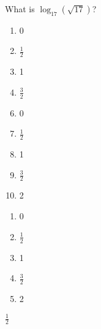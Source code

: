 






 What is $\log_{17}(\sqrt{17})$?


\ifsat
	\begin{enumerate}[label=\Alph*)]
		\item  0
		\item  $\frac{1}{2}$%
		\item  1
		\item $\frac{3}{2}$
	\end{enumerate}
\else
\fi

\ifacteven
	\begin{enumerate}[label=\textbf{\Alph*.},itemsep=\fill,align=left]
		\setcounter{enumii}{5}
		\item  0
		\item  $\frac{1}{2}$%
		\item  1
		\addtocounter{enumii}{1}
		\item $\frac{3}{2}$
		\item   2
	\end{enumerate}
\else
\fi

\ifactodd
	\begin{enumerate}[label=\textbf{\Alph*.},itemsep=\fill,align=left]
		\item  0
		\item  $\frac{1}{2}$%
		\item  1
		\item $\frac{3}{2}$
		\item   2
	\end{enumerate}
\else
\fi

\ifgridin
  $\frac{1}{2}$%
		
\else
\fi

